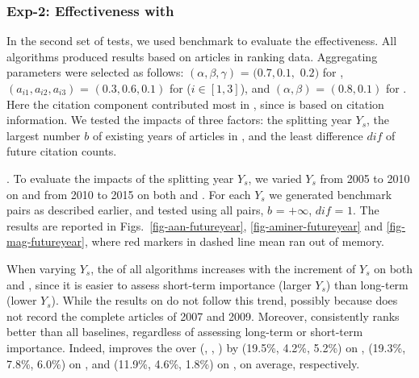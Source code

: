 \subsubsection{Exp-2: Effectiveness with \fcita}
In the second set of tests, we used benchmark \fcita to evaluate the effectiveness.
All algorithms produced results based on articles in ranking data.
Aggregating parameters were selected as follows: $(\alpha, \beta, \gamma)$ = $(0.7, 0.1,$ $0.2)$ for \futurerank, $(a_{i1}, a_{i2}, a_{i3})$ = $(0.3, 0.6, 0.1)$ for \hhgrank ($i\in[1, 3]$), and $(\alpha, \beta)$ = $(0.8, 0.1)$ for \ensemblerank.
Here the citation component contributed most in \ensemblerank, since \fcita is based on citation information.
We tested the impacts of three factors: the splitting year $Y_s$, the largest number $b$ of existing years of articles in \fcita, and the least difference $dif$ of future citation counts.



.%
To evaluate the impacts of the splitting year $Y_s$, we varied $Y_s$ from 2005 to 2010 on \aan and from 2010 to 2015 on both \aminer and \magdata.
For each $Y_s$ we generated benchmark pairs as described earlier, and tested \PairAcc using all pairs, \ie $b$ = $+\infty$, $dif$ = $1$. The results are reported in Figs.~\ref{fig-aan-futureyear}, \ref{fig-aminer-futureyear} and \ref{fig-mag-futureyear}, where red markers \marked{$\Box$} in dashed line mean \hhgrank ran out of memory.


When varying $Y_s$, the \PairAcc of all algorithms increases with the increment of $Y_s$ on both \aminer and \magdata, since it is easier to assess short-term importance (larger $Y_s$) than long-term (lower $Y_s$). While the results on \aan do not follow this trend, possibly because \aan does not record the complete articles of 2007 and 2009.
Moreover, \ensemblerank consistently ranks better than all baselines, regardless of assessing long-term or short-term importance.
Indeed, \ensemblerank improves the \PairAcc over (\pagerank, \futurerank, \hhgrank) by (19.5\%, 4.2\%, 5.2\%) on \aan, (19.3\%, 7.8\%, 6.0\%) on \aminer, and  (11.9\%, 4.6\%, 1.8\%) on \magdata, on average, respectively.

